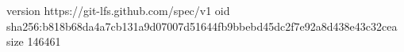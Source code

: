version https://git-lfs.github.com/spec/v1
oid sha256:b818b68da4a7cb131a9d07007d51644fb9bbebd45dc2f7e92a8d438e43c32cea
size 146461

